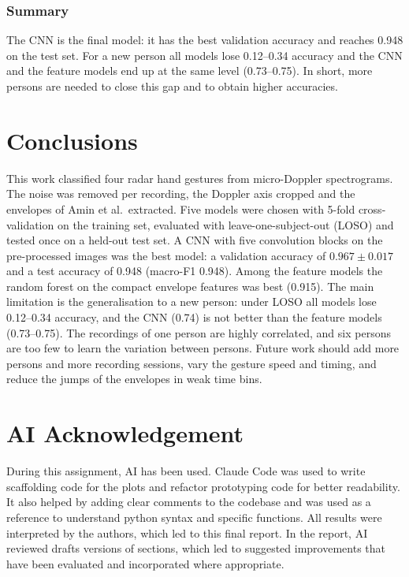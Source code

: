 \documentclass[10pt,a4paper,titlepage]{article}
\begin{document}
\subsubsection{Summary}
The CNN is the final model: it has the best validation accuracy and reaches
0.948 on the test set. For a new person all models lose 0.12--0.34 accuracy and
the CNN and the feature models end up at the same level (0.73--0.75). In short, more
persons are needed to close this gap and to obtain higher accuracies.

\newpage
\section{Conclusions}
\label{sec:conclusions}

This work classified four radar hand gestures from micro-Doppler spectrograms.
The noise was removed per recording, the Doppler axis cropped and the envelopes
of Amin et al.\ extracted. Five models were chosen with 5-fold cross-validation
on the training set, evaluated with leave-one-subject-out (LOSO) and tested once
on a held-out test set. A CNN with five convolution blocks on the pre-processed
images was the best model: a validation accuracy of $0.967 \pm 0.017$ and a test
accuracy of 0.948 (macro-F1 0.948). Among the feature models the random forest
on the compact envelope features was best (0.915). The main limitation is the
generalisation to a new person: under LOSO all models lose 0.12--0.34 accuracy,
and the CNN (0.74) is not better than the feature models (0.73--0.75). The
recordings of one person are highly correlated, and six persons are too few to
learn the variation between persons. Future work should add more persons and
more recording sessions, vary the gesture speed and timing, and reduce the jumps
of the envelopes in weak time bins.

\newpage
\section{AI Acknowledgement}
During this assignment, AI has been used. Claude Code was used to write scaffolding code for the plots and refactor prototyping code for better readability. It also helped by adding clear comments to the codebase and was used as a reference to understand python syntax and specific functions. All results were interpreted by the authors, which led to this final report. In the report, AI reviewed drafts versions of sections, which led to suggested improvements that have been evaluated and incorporated where appropriate.
\end{document}
